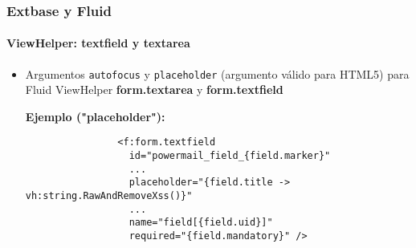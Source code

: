 
\begin{frame}[fragile]
	\frametitle{Extbase y Fluid}
	\framesubtitle{ViewHelper: textfield y textarea}

	\begin{itemize}
		\item Argumentos \texttt{autofocus} y \texttt{placeholder} (argumento válido para HTML5) para Fluid ViewHelper \textbf{form.textarea} y \textbf{form.textfield}\newline

			\smaller\textbf{Ejemplo ("placeholder"):}\normalsize
			\begin{lstlisting}
				<f:form.textfield
				  id="powermail_field_{field.marker}"
				  ...
				  placeholder="{field.title -> vh:string.RawAndRemoveXss()}"
				  ...
				  name="field[{field.uid}]"
				  required="{field.mandatory}" />
			\end{lstlisting}

	\end{itemize}

\end{frame}



